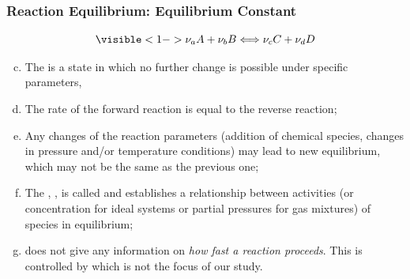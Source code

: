 \documentclass[10pt,compress,handout,unknownkeysallowed]{beamer}
\begin{document}
\begin{frame}
  \frametitle{Reaction Equilibrium: Equilibrium Constant}
        \begin{displaymath}
           \visible<1->{\nu_{a}A + \nu_{b}B  \Longleftrightarrow \nu_{c}C + \nu_{d}D } 
        \end{displaymath}
      \begin{enumerate}[a)]\setcounter{enumi}{2}
         \item<1-> The  is a state in which no further change is possible under specific parameters, \ie 
         \item<1-> The rate of the forward reaction is equal to the reverse reaction;
         \item<2-> Any changes of the reaction parameters (\eg addition of chemical species, changes in pressure and/or temperature conditions) may lead to new equilibrium, which may not be the same as the previous one;
         \item<3-> The , , is called  and establishes a relationship between activities (or concentration for ideal systems or partial pressures for gas mixtures) of species in equilibrium;
         \item<3->  does not give any information on {\it how fast a reaction proceeds}. This is controlled by  which is not the focus of our study.
      \end{enumerate}
\end{frame}
\end{document}
